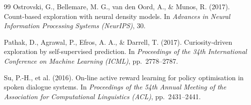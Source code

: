 \documentclass[12pt,a4paper]{article}
\begin{document}
\begin{thebibliography}{99}
Ostrovski, G., Bellemare, M. G., van den Oord, A., \& Munos, R. (2017).
Count-based exploration with neural density models.
In \textit{Advances in Neural Information Processing Systems (NeurIPS)}, 30.

Pathak, D., Agrawal, P., Efros, A. A., \& Darrell, T. (2017).
Curiosity-driven exploration by self-supervised prediction.
In \textit{Proceedings of the 34th International Conference on Machine Learning (ICML)}, pp.~2778--2787.

Su, P.-H., et al. (2016).
On-line active reward learning for policy optimisation in spoken dialogue systems.
In \textit{Proceedings of the 54th Annual Meeting of the Association for Computational Linguistics (ACL)}, pp.~2431--2441.

\end{thebibliography}
\end{document}
